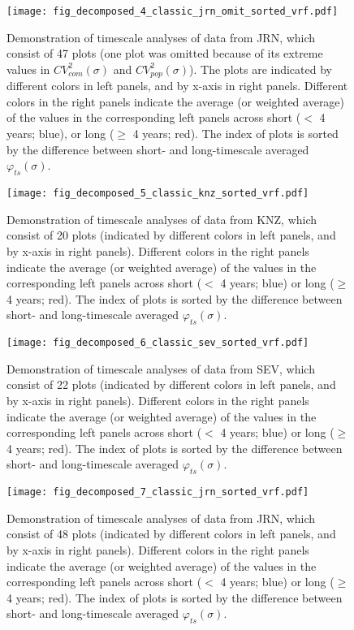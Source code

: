 \documentclass[letterpaper,11pt]{article}
\begin{document}
\begin{figure}
\texttt{[image: fig\_decomposed\_4\_classic\_jrn\_omit\_sorted\_vrf.pdf]}
\caption{Demonstration of timescale analyses of data from JRN, which consist of 47 plots (one plot was omitted because of its extreme values in $CV^2_{com} (\sigma)$ and $CV^2_{pop} (\sigma)$). The plots are indicated by different colors in left panels, and by x-axis in right panels. Different colors in the right panels indicate the average (or weighted average) of the values in the corresponding left panels across short ($<$ 4 years; blue), or long ($\geq$ 4 years; red). The index of plots is sorted by the difference between short- and long-timescale averaged $\varphi _{ts} (\sigma)$.}
\end{figure}

\begin{figure}
\texttt{[image: fig\_decomposed\_5\_classic\_knz\_sorted\_vrf.pdf]}
\caption{Demonstration of timescale analyses of data from KNZ, which consist of 20 plots (indicated by different colors in left panels, and by x-axis in right panels). Different colors in the right panels indicate the average (or weighted average) of the values in the corresponding left panels across short ($<$ 4 years; blue) or long ($\geq$ 4 years; red). The index of plots is sorted by the difference between short- and long-timescale averaged $\varphi _{ts} (\sigma)$.}
\end{figure}

\begin{figure}
\texttt{[image: fig\_decomposed\_6\_classic\_sev\_sorted\_vrf.pdf]}
\caption{Demonstration of timescale analyses of data from SEV, which consist of 22 plots (indicated by different colors in left panels, and by x-axis in right panels). Different colors in the right panels indicate the average (or weighted average) of the values in the corresponding left panels across short ($<$ 4 years; blue) or long ($\geq$ 4 years; red). The index of plots is sorted by the difference between short- and long-timescale averaged $\varphi _{ts} (\sigma)$.}
\end{figure}

\begin{figure}
\texttt{[image: fig\_decomposed\_7\_classic\_jrn\_sorted\_vrf.pdf]}
\caption{Demonstration of timescale analyses of data from JRN, which consist of 48 plots (indicated by different colors in left panels, and by x-axis in right panels). Different colors in the right panels indicate the average (or weighted average) of the values in the corresponding left panels across short ($<$ 4 years; blue) or long ($\geq$ 4 years; red). The index of plots is sorted by the difference between short- and long-timescale averaged $\varphi _{ts} (\sigma)$.}
\end{figure}
\end{document}
